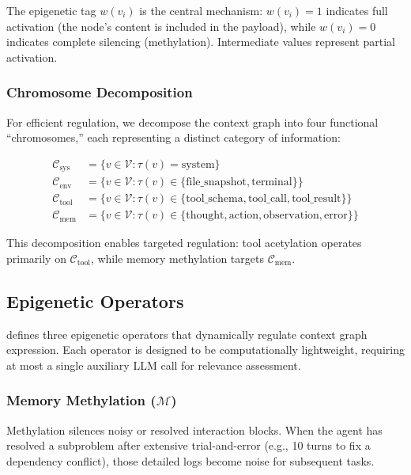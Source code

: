 The epigenetic tag $w(v_i)$ is the central mechanism: $w(v_i) = 1$ indicates full activation (the node's content is included in the payload), while $w(v_i) = 0$ indicates complete silencing (methylation). Intermediate values represent partial activation.

\subsubsection{Chromosome Decomposition}

For efficient regulation, we decompose the context graph into four functional ``chromosomes,'' each representing a distinct category of information:

\begin{align}
    \mathcal{C}_{\text{sys}} &= \{v \in \mathcal{V} : \tau(v) = \text{system}\} \label{eq:csys} \\
    \mathcal{C}_{\text{env}} &= \{v \in \mathcal{V} : \tau(v) \in \{\text{file\_snapshot}, \text{terminal}\}\} \label{eq:cenv} \\
    \mathcal{C}_{\text{tool}} &= \{v \in \mathcal{V} : \tau(v) \in \{\text{tool\_schema}, \text{tool\_call}, \text{tool\_result}\}\} \label{eq:ctool} \\
    \mathcal{C}_{\text{mem}} &= \{v \in \mathcal{V} : \tau(v) \in \{\text{thought}, \text{action}, \text{observation}, \text{error}\}\} \label{eq:cmem}
\end{align}

This decomposition enables targeted regulation: tool acetylation operates primarily on $\mathcal{C}_{\text{tool}}$, while memory methylation targets $\mathcal{C}_{\text{mem}}$.

\subsection{Epigenetic Operators}
\label{sec:operators}

\EpiContext{} defines three epigenetic operators that dynamically regulate context graph expression. Each operator is designed to be computationally lightweight, requiring at most a single auxiliary LLM call for relevance assessment.

\subsubsection{Memory Methylation ($\mathcal{M}$)}

Methylation silences noisy or resolved interaction blocks. When the agent has resolved a subproblem after extensive trial-and-error (e.g., 10 turns to fix a dependency conflict), those detailed logs become noise for subsequent tasks.


